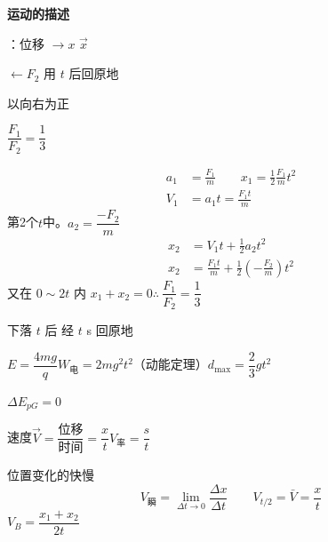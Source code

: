 \textbf{运动的描述}

：位移 $\longrightarrow x$
$\vec x$
\begin{problem}
$\leftarrow F_2$ 用 $t$ 后回原地
\begin{solution}
以向右为正

$\dfrac{F_1}{F_2}=\dfrac13$

\begin{align*}
a_1&=\frac{F_1}{m}\qquad x_1=\frac12\frac{F_1}{m}t^2\\
V_1&=a_1t=\frac{F_1t}{m}
\end{align*}
第2个$t$中。$a_2=\dfrac{-F_2}{m}$
\begin{align*}
x_2&=V_1t+\frac12a_2t^2\\
x_2&=\frac{F_1t}{m}+\frac12\left(-\frac{F_2}{m}\right)t^2 %
\end{align*}
又在 $0\sim2t$ 内 $x_1+x_2=0$\quad $\therefore\ \dfrac{F_1}{F_2}=\dfrac13$
\end{solution}
\end{problem}
\begin{problem}
下落 $t$ 后 经 $t$ s 回原地
\begin{solution}
$E=\dfrac{4mg}{q}$\qquad $W_{\text{电}}=2mg^2t^2$（动能定理）\qquad $d_{\max}=\dfrac23gt^2$

$\Delta E_{pG}=0$
\end{solution}
\end{problem}
速度\quad $\vec V=\dfrac{\text{位移}}{\text{时间}}=\dfrac{x}{t}$\quad $V_{\text{率}}=\dfrac{s}{t}$

位置变化的快慢
\[
V_{\text{瞬}}=\lim_{\Delta t\to0}\frac{\Delta x}{\Delta t}\qquad V_{t/2}=\bar V=\frac{x}{t}
\]
$V_B=\dfrac{x_1+x_2}{2t}$

